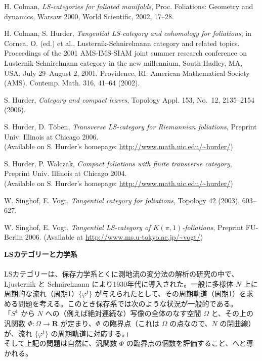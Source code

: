 \documentclass[uplatex,dvipdfmx]{jlreq}
\begin{document}
\begin{enumerate}[{[1]}]
\item H. Colman, \textit{LS-categories for foliated manifolds}, Proc. Foliations: Geometry and dynamics, Warsaw 2000, World Scientific, 2002, 17--28.
\item H. Colman, S. Hurder, \textit{Tangential LS-category and cohomology for foliations}, in Cornea, O. (ed.) et al., Lusternik-Schnirelmann category and related topics. Proceedings of the 2001 AMS-IMS-SIAM joint summer research conference on Lusternik-Schnirelmann category in the new millennium, South Hadley, MA, USA, July 29--August 2, 2001. Providence, RI: American Mathematical Society (AMS). Contemp. Math. 316, 41--64 (2002).
\item S. Hurder, \textit{Category and compact leaves}, Topology Appl. 153, No.~12, 2135--2154 (2006).
\item S. Hurder, D. T\"{o}ben, \textit{Transverse LS-category for Riemannian foliations}, Preprint Univ. Illinois at Chicago 2006.\\
(Available on S. Hurder's homepage: \url{http://www.math.uic.edu/~hurder/})
\item S. Hurder, P. Walczak, \textit{Compact foliations with finite transverse category}, Preprint Univ. Illinois at Chicago 2004.\\
(Available on S. Hurder's homepage: \url{http://www.math.uic.edu/~hurder/})
\item W. Singhof, E. Vogt, \textit{Tangential category for foliations}, Topology 42 (2003), 603--627.
\item W. Singhof, E. Vogt, \textit{Tangential LS-category of $K(\pi,1)$-foliations}, Preprint FU-Berlin 2006. (Available at \url{http://www.ms.u-tokyo.ac.jp/~vogt/})
\end{enumerate}

\newpage
\noindent
{\large\bfseries LSカテゴリーと力学系}\\
~\hspace*{\fill}{\large\bfseries 松元重則（日大・理工）}\\

LSカテゴリーは、保存力学系とくに測地流の変分法の解析の研究の中で、Ljusternik と Schnirelmann により1930年代に導入された。一般に多様体 $N$ 上に周期的な流れ（周期1）$\{\varphi^t\}$ が与えられたとして、その周期軌道（周期1）を求める問題を考える。このとき保存系では次のような状況が一般的である。
\\[3mm]
「$S^1$ から $N$ への（例えば絶対連続な）写像の全体のなす空間 $\Omega$ と、その上の汎関数 $\Phi:\Omega\to\mathbf{R}$ が定まり、$\Phi$ の臨界点（これは $\Omega$ の点なので、$N$ の閉曲線）が、流れ $\{\varphi^t\}$ の周期軌道に対応する。」
\\[3mm]
そして上記の問題は自然に、汎関数 $\Phi$ の臨界点の個数を評価すること、へと導かれる。
\end{document}
